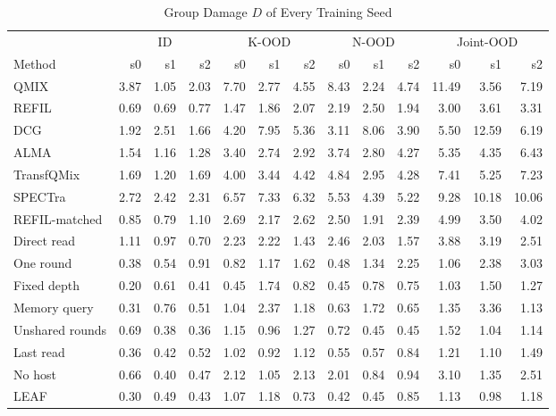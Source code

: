 \begin{table}[!t]
\centering
\scriptsize
\setlength{\tabcolsep}{3.5pt}
\caption{Group Damage $D$ of Every Training Seed}
\label{tab:s-seeds}
\begin{tabular}{@{}lrrrrrrrrrrrr@{}}
\toprule
 & \multicolumn{3}{c}{ID} & \multicolumn{3}{c}{K-OOD} & \multicolumn{3}{c}{N-OOD} & \multicolumn{3}{c}{Joint-OOD}\\
\cmidrule(lr){2-4}\cmidrule(lr){5-7}\cmidrule(lr){8-10}\cmidrule(l){11-13}
Method & s0 & s1 & s2 & s0 & s1 & s2 & s0 & s1 & s2 & s0 & s1 & s2\\
\midrule
QMIX & 3.87 & 1.05 & 2.03 & 7.70 & 2.77 & 4.55 & 8.43 & 2.24 & 4.74 & 11.49 & 3.56 & 7.19\\
REFIL & 0.69 & 0.69 & 0.77 & 1.47 & 1.86 & 2.07 & 2.19 & 2.50 & 1.94 & 3.00 & 3.61 & 3.31\\
DCG & 1.92 & 2.51 & 1.66 & 4.20 & 7.95 & 5.36 & 3.11 & 8.06 & 3.90 & 5.50 & 12.59 & 6.19\\
ALMA & 1.54 & 1.16 & 1.28 & 3.40 & 2.74 & 2.92 & 3.74 & 2.80 & 4.27 & 5.35 & 4.35 & 6.43\\
TransfQMix & 1.69 & 1.20 & 1.69 & 4.00 & 3.44 & 4.42 & 4.84 & 2.95 & 4.28 & 7.41 & 5.25 & 7.23\\
SPECTra & 2.72 & 2.42 & 2.31 & 6.57 & 7.33 & 6.32 & 5.53 & 4.39 & 5.22 & 9.28 & 10.18 & 10.06\\
REFIL-matched & 0.85 & 0.79 & 1.10 & 2.69 & 2.17 & 2.62 & 2.50 & 1.91 & 2.39 & 4.99 & 3.50 & 4.02\\
\midrule
Direct read & 1.11 & 0.97 & 0.70 & 2.23 & 2.22 & 1.43 & 2.46 & 2.03 & 1.57 & 3.88 & 3.19 & 2.51\\
One round & 0.38 & 0.54 & 0.91 & 0.82 & 1.17 & 1.62 & 0.48 & 1.34 & 2.25 & 1.06 & 2.38 & 3.03\\
Fixed depth & 0.20 & 0.61 & 0.41 & 0.45 & 1.74 & 0.82 & 0.45 & 0.78 & 0.75 & 1.03 & 1.50 & 1.27\\
Memory query & 0.31 & 0.76 & 0.51 & 1.04 & 2.37 & 1.18 & 0.63 & 1.72 & 0.65 & 1.35 & 3.36 & 1.13\\
Unshared rounds & 0.69 & 0.38 & 0.36 & 1.15 & 0.96 & 1.27 & 0.72 & 0.45 & 0.45 & 1.52 & 1.04 & 1.14\\
Last read & 0.36 & 0.42 & 0.52 & 1.02 & 0.92 & 1.12 & 0.55 & 0.57 & 0.84 & 1.21 & 1.10 & 1.49\\
No host & 0.66 & 0.40 & 0.47 & 2.12 & 1.05 & 2.13 & 2.01 & 0.84 & 0.94 & 3.10 & 1.35 & 2.51\\
\midrule
LEAF & 0.30 & 0.49 & 0.43 & 1.07 & 1.18 & 0.73 & 0.42 & 0.45 & 0.85 & 1.13 & 0.98 & 1.18\\
\bottomrule
\end{tabular}
\end{table}

